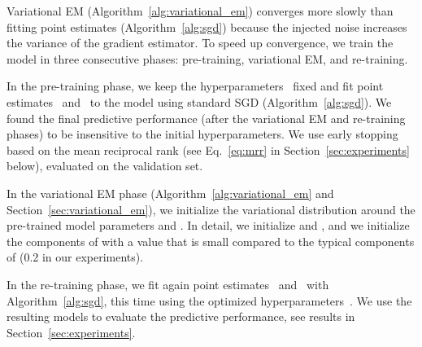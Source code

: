 \documentclass[letterpage]{article}
\begin{document}
Variational EM (Algorithm~\ref{alg:variational_em}) converges more slowly than fitting point estimates (Algorithm~\ref{alg:sgd}) because the injected noise increases the variance of the gradient estimator.
To speed up convergence, we train the model in three consecutive phases: pre-training, variational EM, and re-training.

In the pre-training phase, we keep the hyperparameters~ fixed and fit point estimates ~and~ to the model using standard SGD (Algorithm~\ref{alg:sgd}).
We found the final predictive performance (after the variational EM and re-training phases) to be insensitive to the initial hyperparameters.
We use early stopping based on the mean reciprocal rank (see Eq.~\ref{eq:mrr} in Section~\ref{sec:experiments} below), evaluated on the validation set.

In the variational EM phase (Algorithm~\ref{alg:variational_em} and Section~\ref{sec:variational_em}), we initialize the variational distribution  around the pre-trained model parameters  and .
In detail, we initialize  and , and we initialize the components of  with a value that is small compared to the typical components of  (0.2 in our experiments).

In the re-training phase, we fit again point estimates~ and~ with Algorithm~\ref{alg:sgd}, this time using the optimized hyperparameters~.
We use the resulting models to evaluate the predictive performance, see results in Section~\ref{sec:experiments}.
\end{document}

